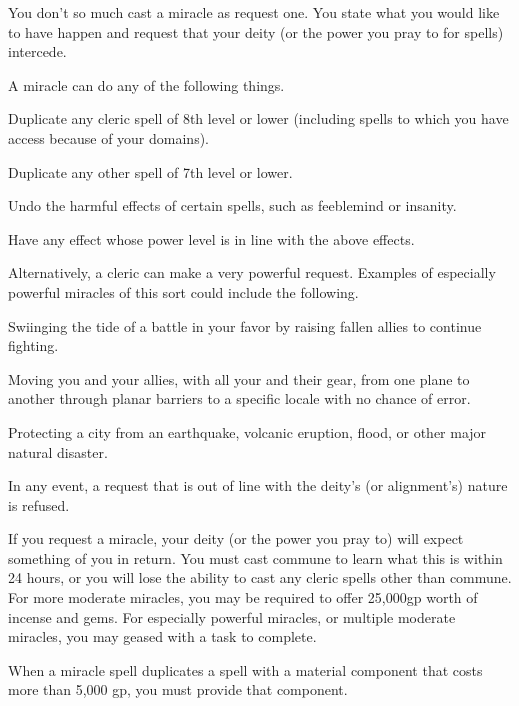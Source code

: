 \begin{spelleffect}
    You don't so much cast a miracle as request one. You state what you would like to have happen and request that your deity (or the power you pray to for spells) intercede.
    \par A miracle can do any of the following things.
    \begin{itemize*}
        \item Duplicate any cleric spell of 8th level or lower (including spells to which you have access because of your domains). 
        \item Duplicate any other spell of 7th level or lower.
        \item Undo the harmful effects of certain spells, such as feeblemind or insanity.
        \item Have any effect whose power level is in line with the above effects.
    \end{itemize*}
    \par Alternatively, a cleric can make a very powerful request. Examples of especially powerful miracles of this sort could include the following.
    \begin{itemize*}
        \item Swiinging the tide of a battle in your favor by raising fallen allies to continue fighting.
        \item Moving you and your allies, with all your and their gear, from one plane to another through planar barriers to a specific locale with no chance of error.
        \item Protecting a city from an earthquake, volcanic eruption, flood, or other major natural disaster.
    \end{itemize*}
    \par In any event, a request that is out of line with the deity's (or alignment's) nature is refused.
\end{spelleffect}
\begin{spellnotes}
    If you request a miracle, your deity (or the power you pray to) will expect something of you in return. You must cast commune to learn what this is within 24 hours, or you will lose the ability to cast any cleric spells other than commune. For more moderate miracles, you may be required to offer 25,000gp worth of incense and gems. For especially powerful miracles, or multiple moderate miracles, you may geased with a task to complete.
    \par When a miracle spell duplicates a spell with a material component that costs more than 5,000 gp, you must provide that component.
\end{spellnotes}

